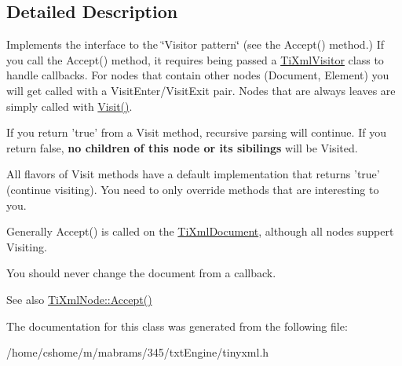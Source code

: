 \subsection{\-Detailed \-Description}
\-Implements the interface to the \char`\"{}\-Visitor pattern\char`\"{} (see the \-Accept() method.) \-If you call the \-Accept() method, it requires being passed a \hyperlink{class_ti_xml_visitor}{\-Ti\-Xml\-Visitor} class to handle callbacks. \-For nodes that contain other nodes (\-Document, \-Element) you will get called with a \-Visit\-Enter/\-Visit\-Exit pair. \-Nodes that are always leaves are simply called with \hyperlink{class_ti_xml_visitor_afad71c71ce6473fb9b4b64cd92de4a19}{\-Visit()}.

\-If you return 'true' from a \-Visit method, recursive parsing will continue. \-If you return false, {\bfseries no children of this node or its sibilings} will be \-Visited.

\-All flavors of \-Visit methods have a default implementation that returns 'true' (continue visiting). \-You need to only override methods that are interesting to you.

\-Generally \-Accept() is called on the \hyperlink{class_ti_xml_document}{\-Ti\-Xml\-Document}, although all nodes suppert \-Visiting.

\-You should never change the document from a callback.

\begin{DoxySeeAlso}{\-See also}
\hyperlink{class_ti_xml_node_acc0f88b7462c6cb73809d410a4f5bb86}{\-Ti\-Xml\-Node\-::\-Accept()} 
\end{DoxySeeAlso}


\-The documentation for this class was generated from the following file\-:\begin{DoxyCompactItemize}
\item 
/home/cshome/m/mabrams/345/txt\-Engine/tinyxml.\-h\end{DoxyCompactItemize}
